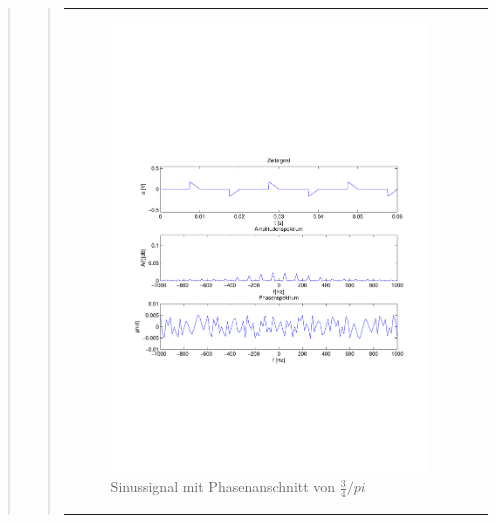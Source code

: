 \begin{quote}
\begin{quote}
\begin{center}
\begin{tabular}{ll}
            \hspace{-11em}
                \begin{minipage}{0.6\textwidth}

                    \begin{figure}[H]
                        \label{fig:}
                        \includegraphics[scale=0.5, trim = 2cm 7cm 1.5cm 8.5cm, clip]{./Bilder/Phasenanschnitt68pi.pdf} %
                        \caption{Sinussignal mit Phasenanschnitt von $\frac{3}{4}/pi$}
                    \end{figure}

                \end{minipage}
                \begin{minipage}{0.6\textwidth}


\end{minipage}
\end{tabular}
\end{center}
\end{quote}
\end{quote}
